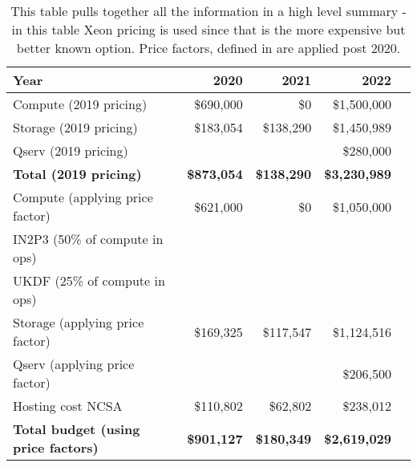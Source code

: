 \tiny \begin{longtable} { |p{}  |r  |r  |r  |r |} 
\caption{This table pulls together all the information in a high level summary - in this table Xeon pricing is used since that is the more expensive but better known option. Price factors, defined in  are applied post 2020.
 \label{tab:Summary}}\\ 
\hline 
\textbf{Year}&\textbf{2020}&\textbf{2021}&\textbf{2022} \\ \hline
{Compute (2019 pricing)}&{\$690,000}&{\$0}&{\$1,500,000} \\ \hline
{Storage (2019 pricing)}&{\$183,054}&{\$138,290}&{\$1,450,989} \\ \hline
{Qserv (2019 pricing)}&{}&{}&{\$280,000} \\ \hline
\textbf{Total (2019 pricing)}&\textbf{\$873,054}&\textbf{\$138,290}&\textbf{\$3,230,989} \\ \hline
{Compute (applying price factor)}&{\$621,000}&{\$0}&{\$1,050,000} \\ \hline
{IN2P3 (50\% of compute in ops)}&{}&{}&{} \\ \hline
{UKDF (25\% of compute in ops)}&{}&{}&{} \\ \hline
{Storage (applying price factor)}&{\$169,325}&{\$117,547}&{\$1,124,516} \\ \hline
{Qserv (applying price factor)}&{}&{}&{\$206,500} \\ \hline
{Hosting cost NCSA
}&{\$110,802}&{\$62,802}&{\$238,012} \\ \hline
\textbf{Total budget (using price factors)}&\textbf{\$901,127}&\textbf{\$180,349}&\textbf{\$2,619,029} \\ \hline
\end{longtable} \normalsize
